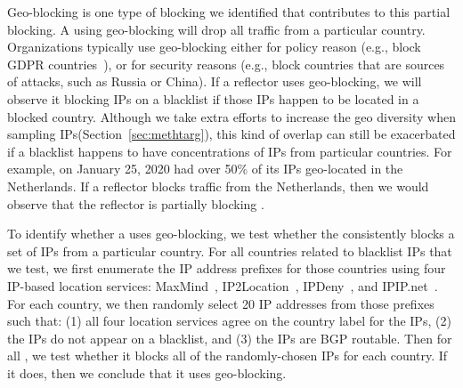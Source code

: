 

Geo-blocking is one type of blocking we identified that contributes to
this partial blocking.  A {} using geo-blocking will
drop all traffic from a particular country.  Organizations typically
use geo-blocking either for policy reason (e.g., block GDPR
countries~\cite{bbcnews}), or for security reasons (e.g., block
countries that are sources of attacks, such as Russia or China).  If a
reflector uses geo-blocking, we will observe it blocking IPs on a
blacklist if those IPs happen to be located in a blocked country.  Although
we take extra efforts to increase the geo diversity when sampling IPs(Section~\ref{sec:methtarg}),
this kind of overlap can still be exacerbated if a blacklist happens to have
concentrations of IPs from particular countries.  For example,
{\dshieldtop} on January 25, 2020 had over 50\% of its IPs geo-located
in the Netherlands.  If a reflector blocks traffic from the
Netherlands, then we would observe that the reflector is partially
blocking {\dshieldtop}.


To identify whether a {} uses geo-blocking, we test whether
the {} consistently blocks a set of IPs from a particular
country.  For all countries related to blacklist IPs that we test, we
first enumerate the IP address prefixes for those countries using four
IP-based location services: MaxMind~\cite{maxmind},
IP2Location~\cite{ip2location}, IPDeny~\cite{ipdeny}, and
IPIP.net~\cite{ipip}.  For each country, we then randomly select 20 IP
addresses from those prefixes such that: (1) all four location
services agree on the country label for the IPs, (2) the IPs do not
appear on a blacklist, and (3) the IPs are BGP routable.  Then for all
{}, we test whether it blocks all of the randomly-chosen
IPs for each country.  If it does, then we conclude that it uses
geo-blocking.

